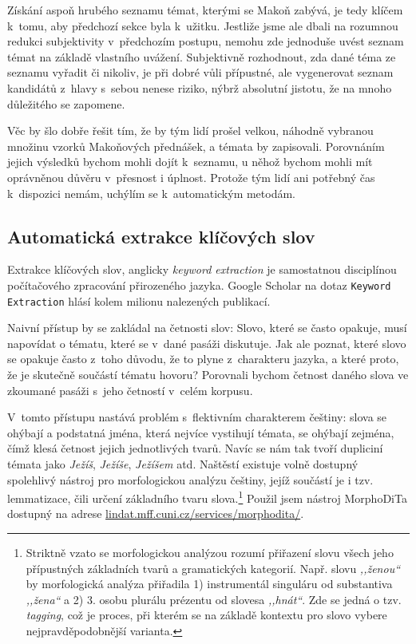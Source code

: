 Získání aspoň hrubého seznamu témat, kterými se Makoň zabývá, je tedy klíčem
k~tomu, aby předchozí sekce byla k~užitku. Jestliže jsme ale dbali na rozumnou
redukci subjektivity v~předchozím postupu, nemohu zde jednoduše uvést seznam
témat na základě vlastního uvážení. Subjektivně rozhodnout, zda dané téma ze
seznamu vyřadit či nikoliv, je při dobré vůli přípustné, ale vygenerovat seznam
kandidátů z~hlavy s~sebou nenese riziko, nýbrž absolutní jistotu, že na mnoho
důležitého se zapomene.

Věc by šlo dobře řešit tím, že by tým lidí prošel velkou, náhodně vybranou
množinu vzorků Makoňových přednášek, a témata by zapisovali. Porovnáním jejich
výsledků bychom mohli dojít k~seznamu, u něhož bychom mohli mít oprávněnou důvěru
v~přesnost i úplnost. Protože tým lidí ani potřebný čas k~dispozici nemám,
uchýlím se k~automatickým metodám.

\subsection{Automatická extrakce klíčových slov}
\label{kap:keywords}

Extrakce klíčových slov, anglicky \textit{keyword extraction} je samostatnou
disciplínou počítačového zpracování přirozeného jazyka. Google Scholar na dotaz
\texttt{Keyword Extraction} hlásí kolem milionu nalezených publikací.

Naivní přístup by se zakládal na četnosti slov: Slovo, které se často opakuje,
musí napovídat o tématu, které se v~dané pasáži diskutuje. Jak ale poznat, které
slovo se opakuje často z~toho důvodu, že to plyne z~charakteru jazyka, a které
proto, že je skutečně součástí tématu hovoru? Porovnali bychom četnost daného
slova ve zkoumané pasáži s~jeho četností v~celém korpusu.

V~tomto přístupu nastává problém s~flektivním charakterem češtiny: slova se
ohýbají a podstatná jména, která nejvíce vystihují témata, se ohýbají zejména,
čímž klesá četnost jejich jednotlivých tvarů. Navíc se nám tak tvoří dupliciní
témata jako \textit{Ježíš}, \textit{Ježíše}, \textit{Ježíšem} atd. Naštěstí existuje volně
dostupný spolehlivý nástroj pro morfologickou analýzu češtiny, jejíž součástí je
i tzv. lemmatizace, čili určení základního tvaru slova.\footnote{Striktně vzato
se morfologickou analýzou rozumí přiřazení slovu všech jeho přípustných
základních tvarů a gramatických kategorií. Např. slovu \textit{,,ženou``} by
morfologická analýza přiřadila 1) instrumentál singuláru od substantiva
\textit{,,žena``} a 2) 3. osobu plurálu prézentu od slovesa \textit{,,hnát``}.
Zde se jedná o tzv. \textit{tagging}, což je proces, při kterém se na základě
kontextu pro slovo vybere nejpravděpodobnější varianta.} Použil jsem nástroj
MorphoDiTa\cite{morphodita} dostupný na adrese
\href{http://lindat.mff.cuni.cz/services/morphodita/}{lindat.mff.cuni.cz/services/morphodita/}.

